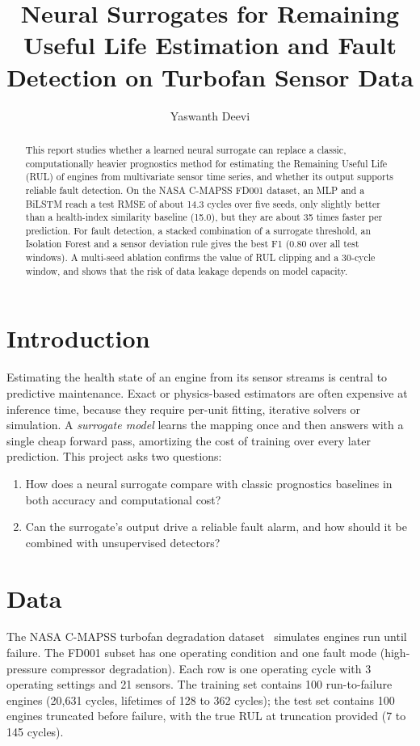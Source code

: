 \documentclass[11pt,a4paper]{article}
\title{Neural Surrogates for Remaining Useful Life Estimation and Fault Detection on Turbofan Sensor Data}
\author{Yaswanth Deevi}
\date{}
\begin{document}
\maketitle

\begin{abstract}
This report studies whether a learned neural surrogate can replace a classic,
computationally heavier prognostics method for estimating the Remaining Useful
Life (RUL) of engines from multivariate sensor time series, and whether its
output supports reliable fault detection. On the NASA C-MAPSS FD001 dataset, an
MLP and a BiLSTM reach a test RMSE of about 14.3 cycles over five seeds, only
slightly better than a health-index similarity baseline (15.0), but they are
about 35 times faster per prediction. For fault detection, a stacked
combination of a surrogate threshold, an Isolation Forest and a sensor
deviation rule gives the best F1 (0.80 over all test windows). A multi-seed
ablation confirms the value of RUL clipping and a 30-cycle window, and shows
that the risk of data leakage depends on model capacity.
\end{abstract}

\section{Introduction}
Estimating the health state of an engine from its sensor streams is central to
predictive maintenance. Exact or physics-based estimators are often expensive
at inference time, because they require per-unit fitting, iterative solvers or
simulation. A \emph{surrogate model} learns the mapping once and then answers
with a single cheap forward pass, amortizing the cost of training over every
later prediction. This project asks two questions:
\begin{enumerate}
  \item How does a neural surrogate compare with classic prognostics baselines
        in both accuracy and computational cost?
  \item Can the surrogate's output drive a reliable fault alarm, and how should
        it be combined with unsupervised detectors?
\end{enumerate}

\section{Data}
The NASA C-MAPSS turbofan degradation dataset~\cite{saxena2008} simulates
engines run until failure. The FD001 subset has one operating condition and
one fault mode (high-pressure compressor degradation). Each row is one
operating cycle with 3 operating settings and 21 sensors. The training set
contains 100 run-to-failure engines (20{,}631 cycles, lifetimes of 128 to 362
cycles); the test set contains 100 engines truncated before failure, with the
true RUL at truncation provided (7 to 145 cycles).
\end{document}
